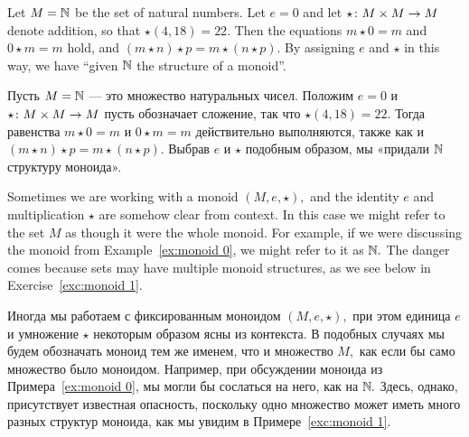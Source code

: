 \documentclass[CT4S-EN-RU]{subfiles}
\begin{document}
\begin{exampleENG}\label{ex:monoid 0}
Let $M={\mathbb N}$ be the set of natural numbers. Let $e=0$ and let $\star\colon M\times M\rightarrow M$ denote addition, so that $\star(4,18)=22.$ Then the equations $m\star 0=m$ and $0\star m=m$ hold, and $(m\star n)\star p=m\star (n\star p).$ By assigning $e$ and $\star$ in this way, we have “given ${\mathbb N}$ the structure of a monoid”.
\end{exampleENG}

\begin{exampleRUS}\label{ex:monoid 0}
Пусть $M={\mathbb N}$ — это множество натуральных чисел. Положим $e=0$ и $\star\colon M\times M\rightarrow M$ пусть обозначает сложение, так что $\star(4,18)=22.$ Тогда равенства $m\star 0=m$ и $0\star m=m$ действительно выполняются, также как и $(m\star n)\star p=m\star (n\star p).$ Выбрав $e$ и $\star$ подобным образом, мы «придали ${\mathbb N}$ структуру моноида».
\end{exampleRUS}

\begin{remarkENG}
Sometimes we are working with a monoid $(M,e,\star),$ and the identity $e$ and multiplication $\star$ are somehow clear from context. In this case we might refer to the set $M$ as though it were the whole monoid. For example, if we were discussing the monoid from Example~\ref{ex:monoid 0}, we might refer to it as ${\mathbb N}.$ The danger comes because sets may have multiple monoid structures, as we see below in Exercise~\ref{exc:monoid 1}.
\end{remarkENG}

\begin{remarkRUS}
Иногда мы работаем с фиксированным моноидом $(M,e,\star),$ при этом единица $e$ и умножение $\star$ некоторым образом ясны из контекста. В подобных случаях мы будем обозначать моноид тем же именем, что и множество $M,$ как если бы само множество было моноидом. Например, при обсуждении моноида из Примера~\ref{ex:monoid 0}, мы могли бы сослаться на него, как на ${\mathbb N}.$ Здесь, однако, присутствует известная опасность, поскольку одно множество может иметь много разных структур моноида, как мы увидим в Примере~\ref{exc:monoid 1}.
\end{remarkRUS}
\end{document}
